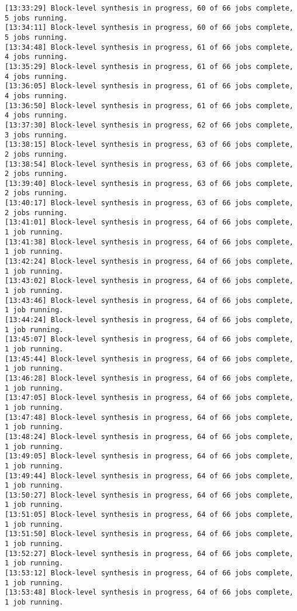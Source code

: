 \begin{lstlisting}[label=func,breaklines=true,breakatwhitespace=false,caption=СОДЕРЖИМОЕ LOG-ФАЙЛА.]
[13:33:29] Block-level synthesis in progress, 60 of 66 jobs complete, 5 jobs running.
[13:34:11] Block-level synthesis in progress, 60 of 66 jobs complete, 5 jobs running.
[13:34:48] Block-level synthesis in progress, 61 of 66 jobs complete, 4 jobs running.
[13:35:29] Block-level synthesis in progress, 61 of 66 jobs complete, 4 jobs running.
[13:36:05] Block-level synthesis in progress, 61 of 66 jobs complete, 4 jobs running.
[13:36:50] Block-level synthesis in progress, 61 of 66 jobs complete, 4 jobs running.
[13:37:30] Block-level synthesis in progress, 62 of 66 jobs complete, 3 jobs running.
[13:38:15] Block-level synthesis in progress, 63 of 66 jobs complete, 2 jobs running.
[13:38:54] Block-level synthesis in progress, 63 of 66 jobs complete, 2 jobs running.
[13:39:40] Block-level synthesis in progress, 63 of 66 jobs complete, 2 jobs running.
[13:40:17] Block-level synthesis in progress, 63 of 66 jobs complete, 2 jobs running.
[13:41:01] Block-level synthesis in progress, 64 of 66 jobs complete, 1 job running.
[13:41:38] Block-level synthesis in progress, 64 of 66 jobs complete, 1 job running.
[13:42:24] Block-level synthesis in progress, 64 of 66 jobs complete, 1 job running.
[13:43:02] Block-level synthesis in progress, 64 of 66 jobs complete, 1 job running.
[13:43:46] Block-level synthesis in progress, 64 of 66 jobs complete, 1 job running.
[13:44:24] Block-level synthesis in progress, 64 of 66 jobs complete, 1 job running.
[13:45:07] Block-level synthesis in progress, 64 of 66 jobs complete, 1 job running.
[13:45:44] Block-level synthesis in progress, 64 of 66 jobs complete, 1 job running.
[13:46:28] Block-level synthesis in progress, 64 of 66 jobs complete, 1 job running.
[13:47:05] Block-level synthesis in progress, 64 of 66 jobs complete, 1 job running.
[13:47:48] Block-level synthesis in progress, 64 of 66 jobs complete, 1 job running.
[13:48:24] Block-level synthesis in progress, 64 of 66 jobs complete, 1 job running.
[13:49:05] Block-level synthesis in progress, 64 of 66 jobs complete, 1 job running.
[13:49:44] Block-level synthesis in progress, 64 of 66 jobs complete, 1 job running.
[13:50:27] Block-level synthesis in progress, 64 of 66 jobs complete, 1 job running.
[13:51:05] Block-level synthesis in progress, 64 of 66 jobs complete, 1 job running.
[13:51:50] Block-level synthesis in progress, 64 of 66 jobs complete, 1 job running.
[13:52:27] Block-level synthesis in progress, 64 of 66 jobs complete, 1 job running.
[13:53:12] Block-level synthesis in progress, 64 of 66 jobs complete, 1 job running.
[13:53:48] Block-level synthesis in progress, 64 of 66 jobs complete, 1 job running.

\end{lstlisting}
